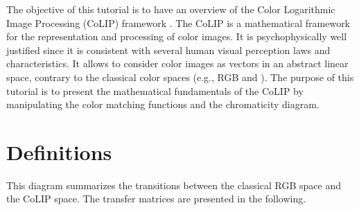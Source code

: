 \def\difficulty{3}

\begin{note}The objective of this tutorial is to have an overview of the Color Logarithmic Image Processing (CoLIP) framework \cite{Gouinaud2013,Gouinaud2011,Gavet2015,Gavet2015a}. The CoLIP is a mathematical framework for the representation and processing of color images. It is psychophysically well justified since it is consistent with several human visual perception laws and characteristics. It allows to consider color images as vectors in an abstract linear space, contrary to the classical color spaces (e.g., RGB and \lab). The  purpose of this tutorial  is to present the mathematical fundamentals of the CoLIP by manipulating the color matching functions and the chromaticity diagram.\end{note}

\vspace*{-.8\baselineskip}

\section{Definitions}
This diagram summarizes the transitions between the classical RGB space and the CoLIP space. The transfer matrices are presented in the following.

